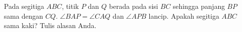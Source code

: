 Pada segitiga $ABC$, titik $P$ dan $Q$ berada pada sisi $BC$ sehingga panjang $BP$ sama dengan $CQ$. $\angle BAP = \angle CAQ$ dan $\angle APB$ lancip. Apakah segitiga $ABC$ sama kaki? Tulis alasan Anda.